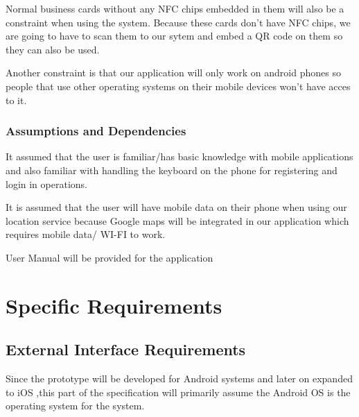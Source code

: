 \documentclass[english]{article}
\begin{document}
                                Normal business cards without any NFC chips embedded in them will also be a constraint when using the                                   system. Because these cards don't have NFC chips, we are going to have  to scan them to our sytem and                                   embed a QR code on them so they can also be used.

                                Another constraint is that our application will only work on android phones so people that use other                                     operating systems on their mobile devices won't have acces to it.  
				
				\subsubsection{Assumptions and Dependencies}
				
				 It assumed that the user is familiar/has basic knowledge with mobile applications  and also familiar                                    with handling the keyboard on the phone for registering and login in operations.

                                 It is assumed that the user will have mobile data on their phone when using our location service                                        because Google maps will be integrated in our application which requires mobile data/ WI-FI to work.

                                 User Manual will be provided for the application 
		
		\newpage

	\section{Specific Requirements}
				\subsection{External Interface Requirements}
						Since the prototype will  be developed for Android systems and later on expanded to iOS ,this part of the specification will 		                                                primarily assume the Android OS is the operating system for the system.
\end{document}
